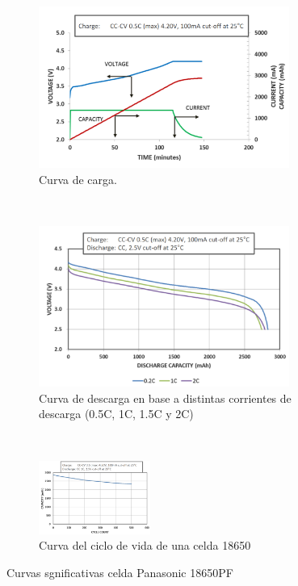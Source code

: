 \documentclass[10pt,a4paper]{article}
\begin{document}
\begin{figure}[h!]
    \begin{subfigure}[t]{.5\textwidth}
	\includegraphics[width=0.9\textwidth]{cc_cv_18650.png}
	\caption{Curva de carga.}
	\label{cc_cv_18650}
    \end{subfigure}%
    ~ 
    \begin{subfigure}[t]{.5\textwidth}
	\includegraphics[width=0.9\textwidth]{discharge_18650.png}
	\caption{Curva de descarga en base a distintas corrientes de descarga (0.5C,
	1C, 1.5C y 2C)}
	\label{descarga_18650}
    \end{subfigure}
    ~ 
    \begin{centering}
	\begin{subfigure}[t]{1\textwidth}
	    \centering
	    \includegraphics[width=0.4\textwidth]{life_cycle_18650.png}
	    \caption{Curva del ciclo de vida de una celda 18650}
        \label{life_cycle_18650}
	\end{subfigure}
    \end{centering}
    \caption{Curvas sgnificativas celda Panasonic 18650PF}
    \label{curvas_sign_18650}
\end{figure}
\end{document}
